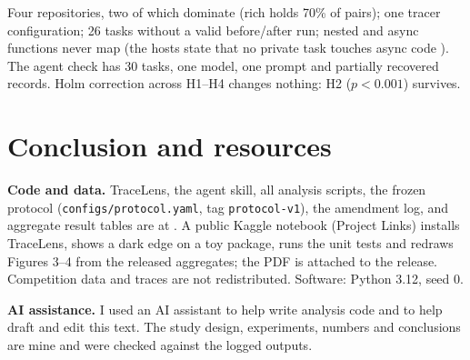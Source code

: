\documentclass[11pt]{article}
\begin{document}
Four repositories, two of which dominate (rich holds 70\% of pairs); one tracer configuration; 26 tasks without a valid before/after run; nested and async functions never map (the hosts state that no private task touches async code \citep{forum745998}). The agent check has 30 tasks, one model, one prompt and partially recovered records. Holm correction across H1--H4 changes nothing: H2 ($p < 0.001$) survives.

\section{Conclusion and resources}


\textbf{Code and data.} TraceLens, the agent skill, all analysis scripts, the frozen protocol (\texttt{configs/protocol.yaml}, tag \texttt{protocol-v1}), the amendment log, and aggregate result tables are at \citep{darkedgesrepo}. A public Kaggle notebook (Project Links) installs TraceLens, shows a dark edge on a toy package, runs the unit tests and redraws Figures 3--4 from the released aggregates; the PDF is attached to the release. Competition data and traces are not redistributed. Software: Python 3.12, seed 0.

\textbf{AI assistance.} I used an AI assistant to help write analysis code and to help draft and edit this text. The study design, experiments, numbers and conclusions are mine and were checked against the logged outputs.

\small


\end{document}
